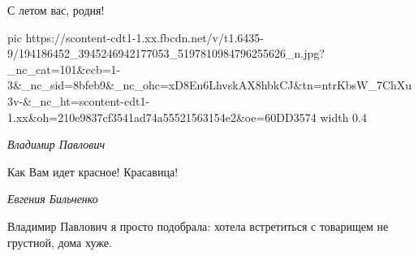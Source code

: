 С летом вас, родня!

\ifcmt
  pic https://scontent-cdt1-1.xx.fbcdn.net/v/t1.6435-9/194186452_3945246942177053_5197810984796255626_n.jpg?_nc_cat=101&ccb=1-3&_nc_sid=8bfeb9&_nc_ohc=xD8En6LhvskAX8hbkCJ&tn=ntrKbsW_7ChXu3v-&_nc_ht=scontent-cdt1-1.xx&oh=210e9837cf3541ad74a55521563154e2&oe=60DD3574
	width 0.4
\fi

\emph{Владимир Павлович}

Как Вам идет красное! Красавица!

\emph{Евгения Бильченко}

Владимир Павлович я просто подобрала: хотела встретиться с товарищем не
грустной, дома хуже.

